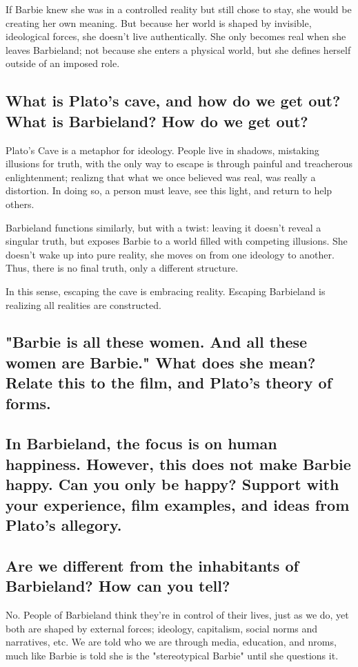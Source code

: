 If Barbie knew she was in a controlled reality but still chose to stay, she would be creating her own meaning.
But because her world is shaped by invisible, ideological forces, she doesn't live authentically. She only becomes
real when she leaves Barbieland; not because she enters a physical world, but she defines herself outside of an imposed role.

\subsection{What is Plato's cave, and how do we get out? What is Barbieland? How do we get out?}

Plato's Cave is a metaphor for ideology. People live in shadows, mistaking illusions for truth, with
the only way to escape is through painful and treacherous enlightenment; realizng that 
what we once believed was real, was really a distortion. In doing so, a person must leave, see this light, and
return to help others.

Barbieland functions similarly, but with a twist: leaving it doesn't reveal a singular truth, but exposes Barbie to a world
filled with competing illusions. She doesn't wake up into pure reality, she moves on from one 
ideology to another. Thus, there is no final truth, only a different structure.

In this sense, escaping the cave is embracing reality. Escaping Barbieland is realizing all realities are constructed.

\subsection{"Barbie is all these women. And all these women are Barbie." What does she mean?
Relate this to the film, and Plato's theory of forms.}

\subsection{In Barbieland, the focus is on human happiness. However, this does not make Barbie happy.
Can you only be happy? Support with your experience, film examples, and ideas from Plato's allegory.}

\subsection{Are we different from the inhabitants of Barbieland? How can you tell?}

No. People of Barbieland think they're in control of their lives,
just as we do, yet both are shaped by external forces; ideology, capitalism,
social norms and narratives, etc. We are told who we are through media, education,
and nroms, much like Barbie is told she is the "stereotypical Barbie" until she questions it.

